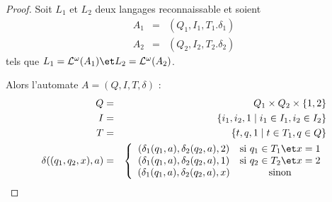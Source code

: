 \begin{proof}
	Soit $L_1$ et $L_2$ deux langages reconnaissable et soient
	\begin{eqnarray*}
		A_1 &=& (Q_1,I_1,T_1.\delta_1) \\
		A_2 &=& (Q_2,I_2,T_2.\delta_2)
	\end{eqnarray*}
	tels que $L_1 = \La ^ {\omega} (A_1) \et  L_2 = \La ^ {\omega} (A_2)$.

	Alors l'automate $A = (Q,I,T,\delta)$ :
	\begin{eqnarray*}
		Q &=& Q_1 \times Q_2 \times \set{1,2}  \\
		I &=& \setdef {i_1,i_2,1} {i_1 \in I_1,i_2 \in I_2 } \\
		T &=&  \setdef {t,q,1} {t \in T_1, q \in Q} \\
		\delta ((q_1,q_2,x), a) &=&
		\left\{
		\begin{array}{cc}
			(\delta_1(q_1,a), \delta_2 (q_2,a), 2) & \text {si } q_1 \in T_1 \et x = 1 \\
			(\delta_1(q_1,a), \delta_2 (q_2,a), 1) & \text {si } q_2 \in T_2 \et x = 2 \\
			(\delta_1(q_1,a), \delta_2 (q_2,a), x) & \text {sinon}
		\end{array}
		\right.
	\end{eqnarray*}
\end{proof}

